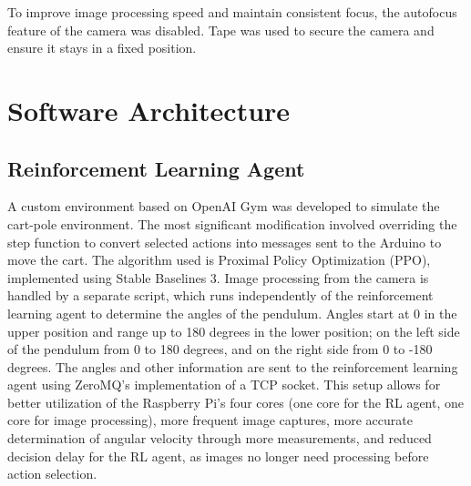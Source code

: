To improve image processing speed and maintain consistent focus, the autofocus feature of the camera was disabled. Tape was used to secure the camera and ensure it stays in a fixed position.

\section{Software Architecture}
\subsection{Reinforcement Learning Agent}
A custom environment based on OpenAI Gym was developed to simulate the cart-pole environment. The most significant modification involved overriding the step function to convert selected actions into messages sent to the Arduino to move the cart. The algorithm used is Proximal Policy Optimization (PPO), implemented using Stable Baselines 3. Image processing from the camera is handled by a separate script, which runs independently of the reinforcement learning agent to determine the angles of the pendulum. Angles start at 0 in the upper position and range up to 180 degrees in the lower position; on the left side of the pendulum from 0 to 180 degrees, and on the right side from 0 to -180 degrees. The angles and other information are sent to the reinforcement learning agent using ZeroMQ's implementation of a TCP socket. This setup allows for better utilization of the Raspberry Pi's four cores (one core for the RL agent, one core for image processing), more frequent image captures, more accurate determination of angular velocity through more measurements, and reduced decision delay for the RL agent, as images no longer need processing before action selection.

